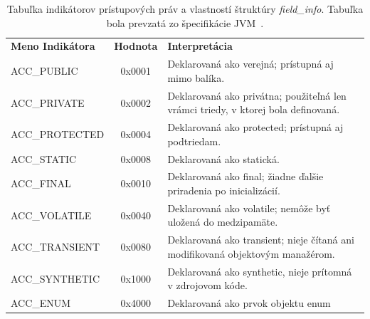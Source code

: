\documentclass[11pt,final,oneside]{fithesis}
\begin{document}
\begin{table}
  \begin{tabular}{| l | c | p{} |}
    \hline
    \textbf{Meno Indikátora} & \textbf{Hodnota} & \textbf{Interpretácia} \\
    \hhline{|=|=|=|}
    ACC\_PUBLIC & 0x0001 & Deklarovaná ako verejná; prístupná aj mimo balíka.
    \\ \hline
    ACC\_PRIVATE & 0x0002 & Deklarovaná ako privátna; použiteľná len vrámci 
    triedy, v ktorej bola definovaná. \\ \hline
    ACC\_PROTECTED & 0x0004 & Deklarovaná ako protected; prístupná aj 
    podtriedam. \\ \hline
    ACC\_STATIC & 0x0008 & Deklarovaná ako statická. \\ \hline
    ACC\_FINAL & 0x0010 & Deklarovaná ako final; žiadne ďalšie priradenia po
    inicializácií. \\ \hline
    ACC\_VOLATILE & 0x0040 & Deklarovaná ako volatile; nemôže byť uložená do
    medzipamäte. \\ \hline
    ACC\_TRANSIENT & 0x0080 & Deklarovaná ako transient; nieje čítaná ani
    modifikovaná objektovým manažérom. \\ \hline
    ACC\_SYNTHETIC & 0x1000 & Deklarovaná ako synthetic, nieje prítomná v
    zdrojovom kóde. \\ \hline
    ACC\_ENUM & 0x4000 & Deklarovaná ako prvok objektu enum \\
    \hline
  \end{tabular}
  \caption{Tabuľka indikátorov prístupových práv a vlastností štruktúry
  \textit {field\_info}. Tabuľka bola prevzatá zo špecifikácie
  JVM~\cite{Lindholm:2013:JVM:2462629}.}
  \label{tab:tab4}
\end{table}
\end{document}
